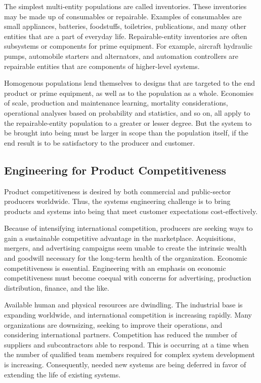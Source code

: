 The simplest multi-entity populations are called inventories. These inventories may be made up of consumables or repairable. Examples of consumables are small appliances, batteries, foodstuffs, toiletries, publications, and many other entities that are a part of everyday life. Repairable-entity inventories are often subsystems or components for prime equipment. For example, aircraft hydraulic pumps, automobile starters and alternators, and automation controllers are repairable entities that are components of higher-level systems.

Homogenous populations lend themselves to designs that are targeted to the end product or prime equipment, as well as to the population as a whole. Economies of scale, production and maintenance learning, mortality considerations, operational analyses based on probability and statistics, and so on, all apply to the repairable-entity population to a greater or lesser degree. But the system to be brought into being must be larger in scope than the population itself, if the end result is to be satisfactory to the producer and customer.

\subsection{Engineering for Product Competitiveness}

Product competitiveness is desired by both commercial and public-sector producers worldwide. Thus, the systems engineering challenge is to bring products and systems into being that meet customer expectations cost-effectively.

Because of intensifying international competition, producers are seeking ways to gain a sustainable competitive advantage in the marketplace. Acquisitions, mergers, and advertising campaigns seem unable to create the intrinsic wealth and goodwill necessary for the long-term health of the organization. Economic competitiveness is essential. Engineering with an emphasis on economic competitiveness must become coequal with concerns for advertising, production distribution, finance, and the like.

Available human and physical resources are dwindling. The industrial base is expanding worldwide, and international competition is increasing rapidly. Many organizations are downsizing, seeking to improve their operations, and considering international partners. Competition has reduced the number of suppliers and subcontractors able to respond. This is occurring at a time when the number of qualified team members required for complex system development is increasing. Consequently, needed new systems are being deferred in favor of extending the life of existing systems.

